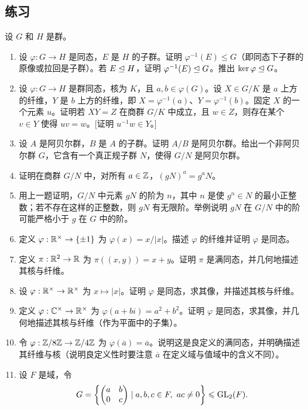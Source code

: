 \subsection*{练习}
设 $G$ 和 $H$ 是群。
\begin{enumerate}[label=\arabic*.]
  \item 设 $\varphi:G\to H$ 是同态，$E$ 是 $H$ 的子群。证明 $\varphi^{-1}(E)\leq G$（即同态下子群的原像或拉回是子群）。若 $E\trianglelefteq H$，证明 $\varphi^{-1}(E)\trianglelefteq G$。推出 $\ker\varphi\trianglelefteq G$。
  \item 设 $\varphi:G\to H$ 是群同态，核为 $K$，且 $a,b\in\varphi(G)$。设 $X\in G/K$ 是 $a$ 上方的纤维，$Y$ 是 $b$ 上方的纤维，即 $X=\varphi^{-1}(a)$、$Y=\varphi^{-1}(b)$。固定 $X$ 的一个元素 $u$。证明若 $XY=Z$ 在商群 $G/K$ 中成立，且 $w\in Z$，则存在某个 $v\in Y$ 使得 $uv=w$。[证明 $u^{-1}w\in Y$。]
  \item 设 $A$ 是阿贝尔群，$B$ 是 $A$ 的子群。证明 $A/B$ 是阿贝尔群。给出一个非阿贝尔群 $G$，它含有一个真正规子群 $N$，使得 $G/N$ 是阿贝尔群。
  \item 证明在商群 $G/N$ 中，对所有 $a\in\mathbb{Z}$，$(gN)^a=g^aN$。
  \item 用上一题证明，$G/N$ 中元素 $gN$ 的阶为 $n$，其中 $n$ 是使 $g^n\in N$ 的最小正整数；若不存在这样的正整数，则 $gN$ 有无限阶。举例说明 $gN$ 在 $G/N$ 中的阶可能严格小于 $g$ 在 $G$ 中的阶。
  \item 定义 $\varphi:\mathbb{R}^\times\to\{\pm1\}$ 为 $\varphi(x)=x/|x|$。描述 $\varphi$ 的纤维并证明 $\varphi$ 是同态。
  \item 定义 $\pi:\mathbb{R}^2\to\mathbb{R}$ 为 $\pi((x,y))=x+y$。证明 $\pi$ 是满同态，并几何地描述其核与纤维。
  \item 设 $\varphi:\mathbb{R}^\times\to\mathbb{R}^\times$ 为 $x\mapsto |x|$。证明 $\varphi$ 是同态，求其像，并描述其核与纤维。
  \item 定义 $\varphi:\mathbb{C}^\times\to\mathbb{R}^\times$ 为 $\varphi(a+bi)=a^2+b^2$。证明 $\varphi$ 是同态，求其像，并几何地描述其核与纤维（作为平面中的子集）。
  \item 令 $\varphi:\mathbb{Z}/8\mathbb{Z}\to\mathbb{Z}/4\mathbb{Z}$ 为 $\varphi(\overline a)=\overline a$。说明这是良定义的满同态，并明确描述其纤维与核（说明良定义性时要注意 $\overline a$ 在定义域与值域中的含义不同）。
  \item 设 $F$ 是域，令
  \[
    G=\left\{\begin{pmatrix}a&b\\0&c\end{pmatrix}\mid a,b,c\in F,
    \ ac\neq0\right\}\leqslant \operatorname{GL}_2(F).
  \]
  \begin{enumerate}[label=(\alph*)]

\end{enumerate}
\end{enumerate}
